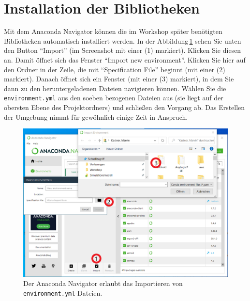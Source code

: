 \documentclass{tufte-handout}
\begin{document}
\section{Installation der Bibliotheken}

Mit dem Anaconda Navigator können die im Workshop später benötigten Bibliotheken automatisch installiert werden.
In der Abbildung\,\ref{fig:anaconda-navigator} sehen Sie unten den Button \enquote{Import} (im Screenshot mit einer (1) markiert).
Klicken Sie diesen an.
Damit öffnet sich das Fenster \enquote{Import new environment}.
Klicken Sie hier auf den Ordner in der Zeile, die mit 
\enquote{Specification File}
beginnt (mit einer (2) markiert).
Danach öffnet sich ein Fenster (mit einer (3) markiert), in dem Sie dann zu den heruntergeladenen Dateien navigieren können.
Wählen Sie die \texttt{environment.yml} aus den soeben bezogenen Dateien aus (sie liegt auf der obersten Ebene des Projektordners) und schließen den Vorgang ab.
Das Erstellen der Umgebung nimmt für gewöhnlich einige Zeit in Anspruch.

\begin{figure}[h]
  \includegraphics{anaconda-navigator-import-new-environment--mit-reihenfolge}
  \caption{Der Anaconda Navigator erlaubt das Importieren von \texttt{environment.yml}-Dateien.}%
\label{fig:anaconda-navigator}
\end{figure}
\end{document}
